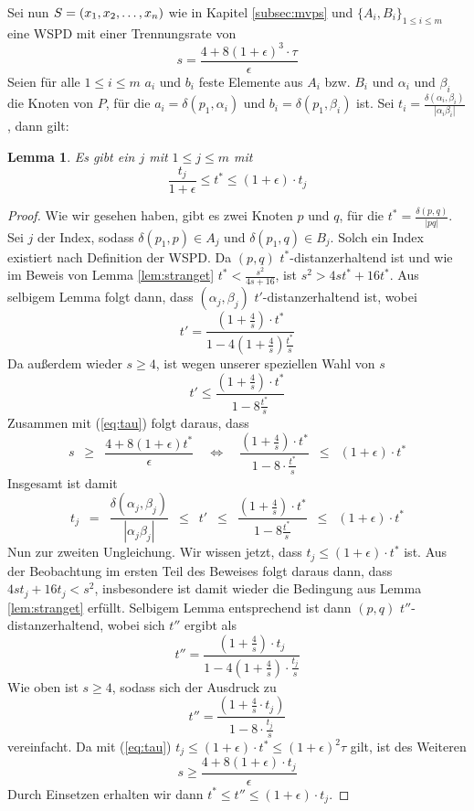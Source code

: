 \documentclass[11pt]{article}
\newtheorem{lemma}[theorem]{Lemma}
\begin{document}
	Sei nun $S = (x_1, x_2, \mathellipsis, x_n)$ wie in Kapitel \ref{subsec:mvps} und $\{A_i, B_i\}_{1 \leq i \leq m}$ eine WSPD mit einer Trennungsrate von 
	\[
	s = \frac{4 + 8(1 + \epsilon)^3 \cdot \tau}{\epsilon}
	\]
	Seien für alle $1 \leq i \leq m$ $a_i$ und $b_i$ feste Elemente aus $A_i$ bzw. $B_i$ und $\alpha_i$ und $\beta_i$ die Knoten von $P$, für die $a_i = \delta(p_1, \alpha_i)$ und $b_i = \delta(p_1, \beta_i)$ ist. 
	Sei $t_i = \frac{\delta(\alpha_i, \beta_i)}{|\alpha_i \beta_i|}$, dann gilt:
	\begin{lemma}
		\label{lem:tstartj}
		Es gibt ein $j$ mit $1 \leq j \leq m$ mit
		\[
			\frac{t_j}{1 + \epsilon} \leq t^* \leq (1 + \epsilon) \cdot t_j
		\]
	\end{lemma}
	\begin{proof}
		Wie wir gesehen haben, gibt es zwei Knoten $p$ und $q$, für die $t^* = \frac{\delta(p, q)}{|pq|}$. Sei $j$ der Index, sodass $\delta(p_1, p) \in A_j$ und $\delta(p_1, q) \in B_j$. Solch ein Index existiert nach Definition der WSPD. Da $(p, q)$ $t^*$-distanzerhaltend ist und wie im Beweis von Lemma \ref{lem:stranget} $t^* < \frac{s^2}{4s + 16}$, ist $s^2 > 4st^* + 16t^*$. 
		Aus selbigem Lemma folgt dann, dass $(\alpha_j, \beta_j)$ $t'$-distanzerhaltend ist, wobei
		\[
		t' = \frac{(1 + \frac{4}{s}) \cdot t^*}{1 - 4(1 + \frac{4}{s})\frac{t^*}{s}}
		\]
		Da außerdem wieder $s \geq 4$, ist wegen unserer speziellen Wahl von $s$
		\[
		t' \leq \frac{(1 + \frac{4}{s}) \cdot t^*}{1 - 8\frac{t^*}{s}}
		\]
		Zusammen mit (\ref{eq:tau}) folgt daraus, dass 
		\[
		s 
		\enspace\geq\enspace \frac{4 + 8(1 + \epsilon)t^*}{\epsilon} 
		\quad \Leftrightarrow \quad
		\frac{(1 + \frac{4}{s})\cdot t^*}{1 - 8 \cdot \frac{t^*}{s}} 
		\enspace\leq\enspace (1 + \epsilon)\cdot t^*
		\]
		Insgesamt ist damit
		\[
		t_j 
		\enspace = \enspace \frac{\delta(\alpha_j, \beta_j)}{|\alpha_j \beta_j|} 
		\enspace\leq\enspace t' 
		\enspace\leq\enspace \frac{(1 + \frac{4}{s}) \cdot t^*}{1 - 8\frac{t^*}{s}}
		\enspace\leq\enspace (1 + \epsilon)\cdot t^*
		\]
		Nun zur zweiten Ungleichung. 
		Wir wissen jetzt, dass $t_j \leq (1 + \epsilon) \cdot t^*$ ist.
		Aus der Beobachtung im ersten Teil des Beweises folgt daraus dann, dass $4st_j + 16t_j < s^2$, insbesondere ist damit wieder die Bedingung aus Lemma \ref{lem:stranget} erfüllt.
		Selbigem Lemma entsprechend ist dann $(p, q)$ $t''$-distanzerhaltend, wobei sich $t''$ ergibt als
		\[
		t'' = \frac{(1 + \frac{4}{s})\cdot t_j}{1 - 4 (1 + \frac{4}{s}) \cdot \frac{t_j}{s}}
		\]
		Wie oben ist $s \geq 4$, sodass sich der Ausdruck zu 
		\[
		t'' = \frac{(1 + \frac{4}{s}\cdot t_j)}{1 - 8 \cdot \frac{t_j}{s}}
		\]
		vereinfacht.
		Da mit (\ref{eq:tau}) $t_j \leq (1 + \epsilon) \cdot t^* \leq (1 + \epsilon)^2 \tau$ gilt, ist des Weiteren
		\[
		s \geq \frac{4 + 8 (1 + \epsilon) \cdot t_j}{\epsilon}
		\]
		Durch Einsetzen erhalten wir dann $t^* \leq t'' \leq (1 + \epsilon)\cdot t_j$.
	\end{proof}
	
\end{document}
